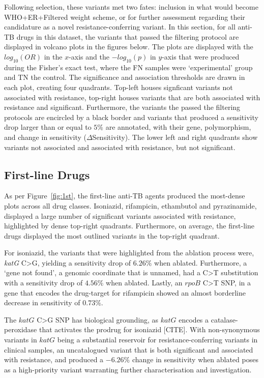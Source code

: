 Following selection, these variants met two fates: inclusion in what would become WHO+ER+Filtered weight scheme, or for further assessment regarding their candidature as a novel resistance-conferring variant. In this section, for all anti-TB drugs in this dataset, the variants that passed the filtering protocol are displayed in volcano plots in the figures below. The plots are displayed with the $log_{10}(OR)$ in the $x$-axis and the $-log_{10}(p)$ in $y$-axis that were produced during the Fisher's exact test, where the FN samples were `experimental' group and TN the control. The significance and association thresholds are drawn in each plot, creating four quadrants. Top-left houses signficant variants not associated with resistance, top-right houses variants that are both associated with resistance and significant. Furthermore, the variants the passed the filtering protocols are encircled by a black border and variants that produced a sensitivity drop larger than or equal to $5\%$ are annotated, with their gene, polymorphism, and change in sensitivity ($\Delta$Sensitivity). The lower left and right quadrants show variants not associated and associated with resistance, but not significant.

\subsection*{First-line Drugs}

As per Figure~\ref{fig:1st}, the first-line anti-TB agents produced the most-dense plots across all drug classes. Isoniazid, rifampicin, ethambutol and pyrazinamide, displayed a large number of significant variants associated with resistance, highlighted by dense top-right quadrants. Furthermore, on average, the first-line drugs displayed the most outlined variants in the top-right quadrant. 

For isoniazid, the variants that were highlighted from the ablation process were, \textit{katG} C>G, yielding a sensitivity drop of $6.26\%$ when ablated. Furthermore, a `gene not found', a genomic coordinate that is unnamed, had a C>T substitution with a sensitivity drop of $4.56\%$ when ablated. Lastly, an $rpoB$ C>T SNP, in a gene that encodes the drug-target for rifampicin showed an almost borderline decrease in sensitivity of $0.73\%$. 

The $katG$ C>G SNP has biological grounding, as $katG$ encodes a catalase-peroxidase that activates the prodrug for isoniazid [CITE]. With non-synonymous variants in $katG$ being a substantial reservoir for resistance-conferring variants in clinical samples, an uncatalogued variant that is both significant and associated with resistance, and produced a $-6.26\%$ change in sensitivity when ablated poses as a high-priority variant warranting further characterisation and investigation.  

